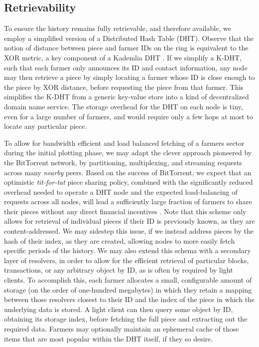 \documentclass[conference]{IEEEtran}
\begin{document}
\subsection{Retrievability}

To ensure the history remains fully retrievable, and therefore available, we employ a simplified version of a Distributed Hash Table (DHT). Observe that the notion of distance between piece and farmer IDs on the ring is equivalent to the XOR metric, a key component of a Kademlia DHT \cite{maymounkov2002kademlia}. If we simplify a K-DHT, such that each farmer only announces its ID and contact information, any node may then retrieve a piece by simply locating a farmer whose ID is close enough to the piece by XOR distance, before requesting the piece from that farmer. This simplifies the K-DHT from a generic key-value store into a kind of decentralized domain name service. The storage overhead for the DHT on each node is tiny, even for a large number of farmers, and would require only a few hops at most to locate any particular piece. 

To allow for bandwidth efficient and load balanced fetching of a farmers sector during the initial plotting phase, we may adapt the clever approach pioneered by the BitTorrent network, by partitioning, multiplexing, and streaming requests across many \textit{nearby} peers. Based on the success of BitTorrent, we expect that an optimistic \textit{tit-for-tat} piece sharing policy, combined with the significantly reduced overhead needed to operate a DHT node and the expected load-balancing of requests across all nodes, will lead a sufficiently large fraction of farmers to share their pieces without any direct financial incentives \cite{cohen2003incentives}. 
Note that this scheme only allows for retrieval of individual pieces if their ID is previously known, as they are content-addressed. We may sidestep this issue, if we instead address pieces by the hash of their index, as they are created, allowing nodes to more easily fetch specific periods of the history. We may also extend this schema with a secondary layer of resolvers, in order to allow for the efficient retrieval of particular blocks, transactions, or any arbitrary object by ID, as is often by required by light clients. To accomplish this, each farmer allocates a small, configurable amount of storage (on the order of one-hundred megabytes) in which they retain a mapping between those resolvers closest to their ID and the index of the piece in which the underlying data is stored. A light client can then query some object by ID, obtaining its storage index, before fetching the full piece and extracting out the required data. Farmers may optionally maintain an ephemeral cache of those items that are most popular within the DHT itself, if they so desire.  
\end{document}
